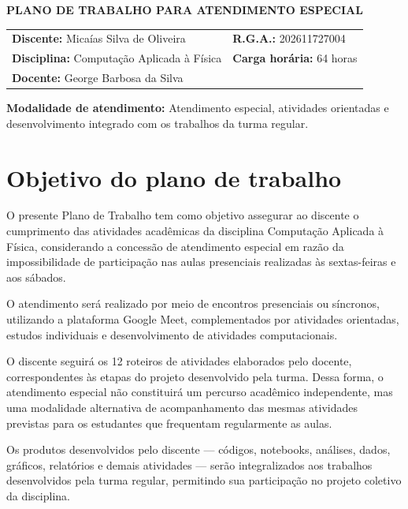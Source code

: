 \documentclass[11pt,a4paper]{article}
\begin{document}
\begin{center}
    {\LARGE \bfseries \color{primary} PLANO DE TRABALHO PARA ATENDIMENTO ESPECIAL}\\[1.5em]
\end{center}

\noindent
\begin{tabularx}{\textwidth}{@{} X X @{}}
\textbf{Discente:} Micaías Silva de Oliveira & \textbf{R.G.A.:} 202611727004 \\[0.8em]
\textbf{Disciplina:} Computação Aplicada à Física & \textbf{Carga horária:} 64 horas \\[0.8em]
\textbf{Docente:} George Barbosa da Silva %
\end{tabularx}

\vspace{0.8em}

\noindent \textbf{Modalidade de atendimento:} Atendimento especial, atividades orientadas e desenvolvimento integrado com os trabalhos da turma regular.

\vspace{1em}

\section{Objetivo do plano de trabalho}
O presente Plano de Trabalho tem como objetivo assegurar ao discente o cumprimento das atividades acadêmicas da disciplina Computação Aplicada à Física, considerando a concessão de atendimento especial em razão da impossibilidade de participação nas aulas presenciais realizadas às sextas-feiras e aos sábados.

O atendimento será realizado por meio de encontros presenciais ou síncronos, utilizando a plataforma Google Meet, complementados por atividades orientadas, estudos individuais e desenvolvimento de atividades computacionais.

O discente seguirá os 12 roteiros de atividades elaborados pelo docente, correspondentes às etapas do projeto desenvolvido pela turma. Dessa forma, o atendimento especial não constituirá um percurso acadêmico independente, mas uma modalidade alternativa de acompanhamento das mesmas atividades previstas para os estudantes que frequentam regularmente as aulas.

Os produtos desenvolvidos pelo discente --- códigos, notebooks, análises, dados, gráficos, relatórios e demais atividades --- serão integralizados aos trabalhos desenvolvidos pela turma regular, permitindo sua participação no projeto coletivo da disciplina.
\end{document}
